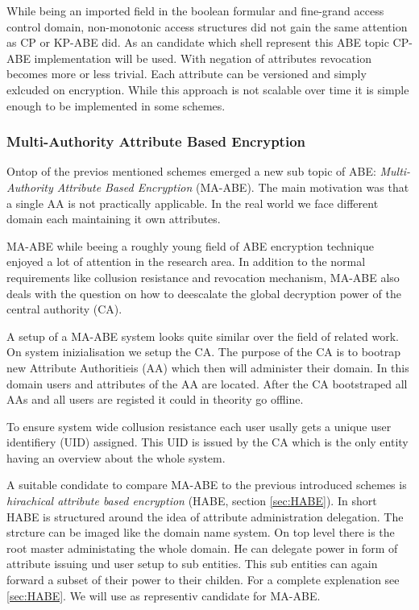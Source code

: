While being an imported field in the boolean formular and fine-grand access control domain, non-monotonic access structures did not gain the same attention as CP or KP-ABE did. As an candidate which shell represent this ABE topic \cite{10.1007/978-3-642-54631-0_16} CP-ABE implementation will be used. With negation of attributes revocation becomes more or less trivial. Each attribute can be versioned and simply exlcuded on encryption. While this approach is not scalable over time it is simple enough to be implemented in some schemes.   

\subsubsection{Multi-Authority Attribute Based Encryption}
Ontop of the previos mentioned schemes emerged a new sub topic of ABE: \textit{Multi-Authority Attribute Based Encryption} (MA-ABE). The main motivation was that a single AA is not practically applicable. In the real world we face different domain each maintaining it own attributes. 

MA-ABE while beeing a roughly young field of ABE encryption technique enjoyed a lot of attention in the research area. In addition to the normal requirements like collusion resistance and revocation mechanism, MA-ABE also deals with the question on how to deescalate the global decryption power of the central authority (CA). 

A setup of a MA-ABE system looks quite similar over the field of related work. On system inizialisation we setup the CA. The purpose of the CA is to bootrap new Attribute Authoritieis (AA) which then will administer their domain. In this domain users and attributes of the AA are located. After the CA bootstraped all AAs and all users are registed it could in theority go offline. 

To ensure system wide collusion resistance each user usally gets a unique user identifiery (UID) assigned. This UID is issued by the CA which is the only entity having an overview about the whole system. 

A suitable condidate to compare MA-ABE to the previous introduced schemes is \textit{hirachical attribute based encryption} (HABE, section \ref{sec:HABE}). In short HABE is structured around the idea of attribute administration delegation. The strcture can be imaged like the domain name system. On top level there is the root master administating the whole domain. He can delegate power in form of attribute issuing und user setup to sub entities. This sub entities can again forward a subset of their power to their childen. For a complete explenation see \ref{sec:HABE}. We will use \cite{Wang:2010:HAE:1866307.1866414} as representiv candidate for MA-ABE. 

